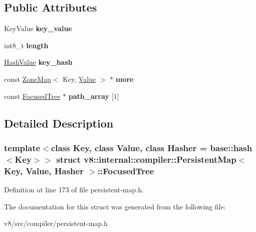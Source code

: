 \subsection*{Public Attributes}
\begin{DoxyCompactItemize}
\item 
\mbox{\label{structv8_1_1internal_1_1compiler_1_1PersistentMap_1_1FocusedTree_a0689cc6068a47dfa35783ad500164c71}} 
Key\+Value {\bfseries key\+\_\+value}
\item 
\mbox{\label{structv8_1_1internal_1_1compiler_1_1PersistentMap_1_1FocusedTree_a8b139362a3c68b508742150bda61ce82}} 
int8\+\_\+t {\bfseries length}
\item 
\mbox{\label{structv8_1_1internal_1_1compiler_1_1PersistentMap_1_1FocusedTree_a0d2ecfa478a84663cf040153398ea82c}} 
\mbox{\hyperlink{classv8_1_1internal_1_1compiler_1_1PersistentMap_1_1HashValue}{Hash\+Value}} {\bfseries key\+\_\+hash}
\item 
\mbox{\label{structv8_1_1internal_1_1compiler_1_1PersistentMap_1_1FocusedTree_add2cd68b39b8cfc02fc0202eddd1fd32}} 
const \mbox{\hyperlink{classv8_1_1internal_1_1ZoneMap}{Zone\+Map}}$<$ Key, \mbox{\hyperlink{classv8_1_1Value}{Value}} $>$ $\ast$ {\bfseries more}
\item 
\mbox{\label{structv8_1_1internal_1_1compiler_1_1PersistentMap_1_1FocusedTree_a0800ab8f7db74a8ca79703c8bbf7175f}} 
const \mbox{\hyperlink{structv8_1_1internal_1_1compiler_1_1PersistentMap_1_1FocusedTree}{Focused\+Tree}} $\ast$ {\bfseries path\+\_\+array} \mbox{[}1\mbox{]}
\end{DoxyCompactItemize}


\subsection{Detailed Description}
\subsubsection*{template$<$class Key, class Value, class Hasher = base\+::hash$<$\+Key$>$$>$\newline
struct v8\+::internal\+::compiler\+::\+Persistent\+Map$<$ Key, Value, Hasher $>$\+::\+Focused\+Tree}



Definition at line 173 of file persistent-\/map.\+h.



The documentation for this struct was generated from the following file\+:\begin{DoxyCompactItemize}
\item 
v8/src/compiler/persistent-\/map.\+h\end{DoxyCompactItemize}
